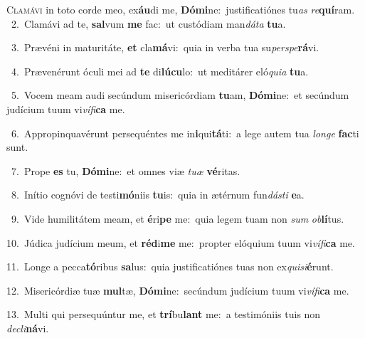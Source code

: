 \lettrine{\initial\textcolor{\initialcolor}{C}}{lamávi} in toto corde meo, ex\-\textbf{áu}\-di me, \textbf{Dó}\-\textbf{mi}ne:~\star justificatiónes tu\textit{as} \textit{re}\-\textbf{quí}ram.\\
{\numbfont\textcolor{\numbcolor}{~2.}}~Clamávi ad te, \textbf{sal}\-vum \textbf{me} fac:~\star ut custódiam man\-\textit{dá}\-\textit{ta} \textbf{tu}\-a.\par
{\numbfont\textcolor{\numbcolor}{~3.}}~Prævéni in maturitáte, \textbf{et} cla\-\textbf{má}\-vi:~\star quia in verba tua su\-\textit{per}\-\textit{spe}\textbf{rá}vi.\par
{\numbfont\textcolor{\numbcolor}{~4.}}~Prævenérunt óculi mei ad \textbf{te} di\-\textbf{lú}\-\textbf{cu}lo:~\star ut meditárer eló\-\textit{qui}\-\textit{a} \textbf{tu}\-a.\par
{\numbfont\textcolor{\numbcolor}{~5.}}~Vocem meam audi secúndum misericórdiam \textbf{tu}\-am, \textbf{Dó}\-\textbf{mi}ne:~\star et secúndum judícium tuum vi\-\textit{ví}\-\textit{fi}\textbf{ca} me.\par
{\numbfont\textcolor{\numbcolor}{~6.}}~Appropinquavérunt persequéntes me in\-\textbf{i}\-qui\-\textbf{tá}\-ti:~\star a lege autem tua \textit{lon}\-\textit{ge} \textbf{fac}\-ti sunt.\par
{\numbfont\textcolor{\numbcolor}{~7.}}~Prope \textbf{es} tu, \textbf{Dó}\-\textbf{mi}ne:~\star et omnes viæ \textit{tu}\-\textit{æ} \textbf{vé}\-ritas.\par
{\numbfont\textcolor{\numbcolor}{~8.}}~Inítio cognóvi de testi\-\textbf{mó}\-niis \textbf{tu}\-is:~\star quia in ætérnum fun\-\textit{dás}\-\textit{ti} \textbf{e}\-a.\par
{\numbfont\textcolor{\numbcolor}{~9.}}~Vide humilitátem meam, et \textbf{é}\-ri\textbf{pe} me:~\star quia legem tuam non \textit{sum} \textit{ob}\-\textbf{lí}tus.\par
{\numbfont\textcolor{\numbcolor}{10.}}~Júdica judícium meum, et \textbf{réd}\-i\textbf{me} me:~\star propter elóquium tuum vi\-\textit{ví}\-\textit{fi}\textbf{ca} me.\par
{\numbfont\textcolor{\numbcolor}{11.}}~Longe a pecca\-\textbf{tó}\-ribus \textbf{sa}\-lus:~\star quia justificatiónes tuas non ex\-\textit{qui}\-\textit{si}\textbf{é}runt.\par
{\numbfont\textcolor{\numbcolor}{12.}}~Misericórdiæ tuæ \textbf{mul}\-tæ, \textbf{Dó}\-\textbf{mi}ne:~\star secúndum judícium tuum vi\-\textit{ví}\-\textit{fi}\textbf{ca} me.\par
{\numbfont\textcolor{\numbcolor}{13.}}~Multi qui persequúntur me, et \textbf{trí}\-bu\textbf{lant} me:~\star a testimóniis tuis non \textit{de}\-\textit{cli}\textbf{ná}vi.\par
